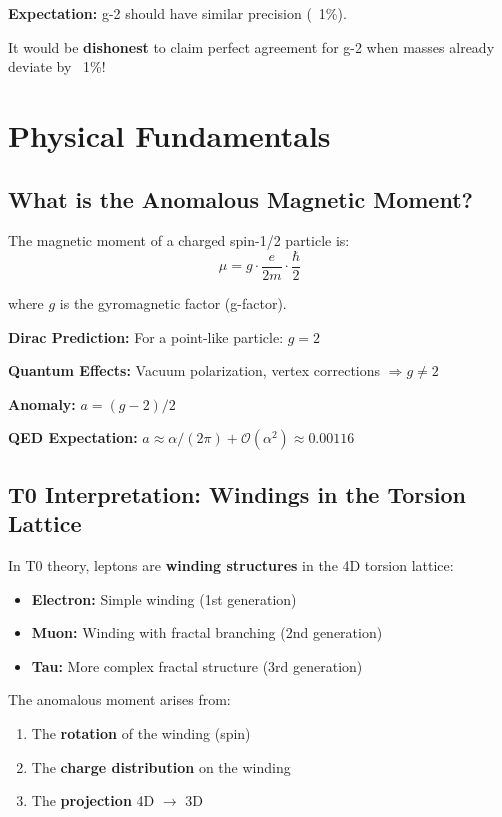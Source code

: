 	\textbf{Expectation:} g-2 should have similar precision (~1\%).
	
	It would be \textbf{dishonest} to claim perfect agreement for g-2 when masses already deviate by ~1\%!
	
	\section{Physical Fundamentals}
	
	\subsection{What is the Anomalous Magnetic Moment?}
	
	The magnetic moment of a charged spin-1/2 particle is:
	\begin{equation}
		\mu = g \cdot \frac{e}{2m} \cdot \frac{\hbar}{2}
	\end{equation}
	
	where $g$ is the gyromagnetic factor (g-factor).
	
	\textbf{Dirac Prediction:} For a point-like particle: $g = 2$
	
	\textbf{Quantum Effects:} Vacuum polarization, vertex corrections $\Rightarrow g \neq 2$
	
	\textbf{Anomaly:} $a = (g-2)/2$
	
	\textbf{QED Expectation:} $a \approx \alpha/(2\pi) + \mathcal{O}(\alpha^2) \approx 0.00116$
	
	\subsection{T0 Interpretation: Windings in the Torsion Lattice}
	
	In T0 theory, leptons are \textbf{winding structures} in the 4D torsion lattice:
	
	\begin{itemize}
		\item \textbf{Electron:} Simple winding (1st generation)
		\item \textbf{Muon:} Winding with fractal branching (2nd generation)
		\item \textbf{Tau:} More complex fractal structure (3rd generation)
	\end{itemize}
	
	The anomalous moment arises from:
	\begin{enumerate}
		\item The \textbf{rotation} of the winding (spin)
		\item The \textbf{charge distribution} on the winding
		\item The \textbf{projection} 4D $\to$ 3D
	\end{enumerate}
	
